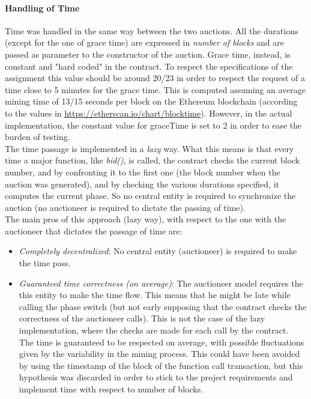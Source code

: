 \documentclass[11pt, a4paper]{report}
\begin{document}
\paragraph*{Handling of Time}
	Time was handled in the same way between the two auctions. All the durations (except for the one of grace time) are expressed in \emph{number of blocks} and are passed as parameter to the constructor of the auction. Grace time, instead, is constant and "hard coded" in the contract. To respect the specifications of the assignment this value should be around 20/23 in order to respect the request of a time close to 5 minutes for the grace time. This is computed assuming an average mining time of 13/15 seconds per block on the Ethereum blockchain (according to the values in \url{https://etherscan.io/chart/blocktime}). However, in the actual implementation, the constant value for graceTime is set to 2 in order to ease the burden of testing. \\
	The time passage is implemented in a \emph{lazy} way. What this means is that every time a major function, like \emph{bid()}, is called, the contract checks the current block number, and by confronting it to the first one (the block number when the auction was generated), and by checking the various durations specified, it computes the current phase. So no central entity is required to synchronize the auction (no auctioneer is required to dictate the passing of time). \\
	The main pros of this approach (lazy way), with respect to the one with the auctioneer that dictates the passage of time are:
	\begin{itemize}
		\item \emph{Completely decentralized}: No central entity (auctioneer) is required to make the time pass.
		\item \emph{Guaranteed time correctness (on average)}: The auctioneer model requires the this entity to make the time flow. This means that he might be late while calling the phase switch (but not early supposing that the contract checks the correctness of the auctioneer calls). This is not the case of the lazy implementation, where the checks are made for each call by the contract.\\ The time is guaranteed to be respected on average, with possible fluctuations given by the variability in the mining process. This could have been avoided by using the timestamp of the block of the function call transaction, but this hypothesis was discarded in order to stick to the project requirements and implement time with respect to number of blocks.
	\end{itemize}
\end{document}
